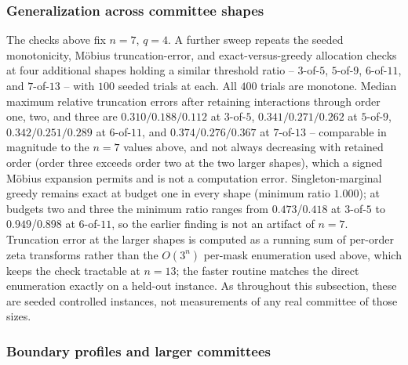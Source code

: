 \subsubsection{Generalization across committee shapes}
\label{subsec:generalized-committee-shapes}

The checks above fix \(n=7\), \(q=4\). A further sweep repeats the seeded
monotonicity, M\"obius truncation-error, and exact-versus-greedy allocation
checks at four additional shapes holding a similar threshold ratio --
\(3\)-of-\(5\), \(5\)-of-\(9\), \(6\)-of-\(11\), and \(7\)-of-\(13\) -- with
\(100\) seeded trials at each. All \(400\) trials are monotone. Median maximum
relative truncation errors after retaining interactions through order one,
two, and three are \(0.310/0.188/0.112\) at \(3\)-of-\(5\),
\(0.341/0.271/0.262\) at \(5\)-of-\(9\), \(0.342/0.251/0.289\) at
\(6\)-of-\(11\), and \(0.374/0.276/0.367\) at \(7\)-of-\(13\) -- comparable in
magnitude to the \(n=7\) values above, and not always decreasing with
retained order (order three exceeds order two at the two larger shapes),
which a signed M\"obius expansion permits and is not a computation error.
Singleton-marginal greedy remains exact at budget one in every shape (minimum
ratio \(1.000\)); at budgets two and three the minimum ratio ranges from
\(0.473\)/\(0.418\) at \(3\)-of-\(5\) to \(0.949\)/\(0.898\) at
\(6\)-of-\(11\), so the earlier finding is not an artifact of \(n=7\).
Truncation error at the larger shapes is computed as a running sum of
per-order zeta transforms rather than the \(O(3^n)\) per-mask enumeration used
above, which keeps the check tractable at \(n=13\); the faster routine matches
the direct enumeration exactly on a held-out instance. As throughout this
subsection, these are seeded controlled instances, not measurements of any
real committee of those sizes.

\subsubsection{Boundary profiles and larger committees}
\label{subsec:boundary-larger-committee}

